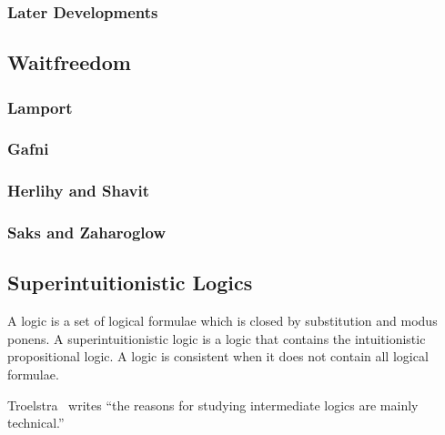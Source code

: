 \subsubsection{Later Developments}

\subsection{Waitfreedom}

\subsubsection{Lamport}

\subsubsection{Gafni}

\subsubsection{Herlihy and Shavit}

\subsubsection{Saks and Zaharoglow}

\subsection{Superintuitionistic Logics}

A logic is a set of logical formulae which is closed by
substitution and modus ponens.
 A superintuitionistic logic is a logic
that contains the intuitionistic propositional logic.  A logic is consistent when it does not
contain all logical formulae.

Troelstra~\cite[p.~223]{goedelcollected} writes ``the reasons
for studying intermediate logics are mainly technical.''


